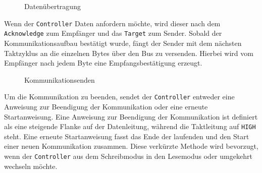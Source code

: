 \begin{wrapfigure}{r}{.4\textwidth}
	\centering
	\scalebox{1.25}{}
	
	\caption{Datenübertragung}
	\label{i2c-data}
\end{wrapfigure}
Wenn der \texttt{Controller} Daten anfordern möchte, wird dieser nach dem \texttt{Acknowledge} zum Empfänger und das \texttt{Target} zum Sender.
Sobald der Kommunikationsaufbau bestätigt wurde, fängt der Sender mit dem nächsten Taktzyklus an die einzelnen Bytes über den Bus zu versenden.
Hierbei wird vom Empfänger nach jedem Byte eine Empfangsbestätigung erzeugt.

\begin{wrapfigure}{r}{.4\textwidth}
	\centering
	\scalebox{1.25}{}
	\scalebox{1.25}{}
	
	\caption{Kommunikationsenden}
	\label{i2c-stop}
\end{wrapfigure}
Um die Kommunikation zu beenden, sendet der \texttt{Controller} entweder eine Anweisung zur Beendigung der Kommunikation oder eine erneute Startanweisung.
Eine Anweisung zur Beendigung der Kommunikation ist definiert als eine steigende Flanke auf der Datenleitung, während die Taktleitung auf \texttt{HIGH} steht.
Eine erneute Startanweisung fasst das Ende der laufenden und den Start einer neuen Kommunikation zusammen.
Diese verkürzte Methode wird bevorzugt, wenn der \texttt{Controller} aus dem Schreibmodus in den Lesemodus oder umgekehrt wechseln möchte.

\cite{I2C-spec_userManual}
